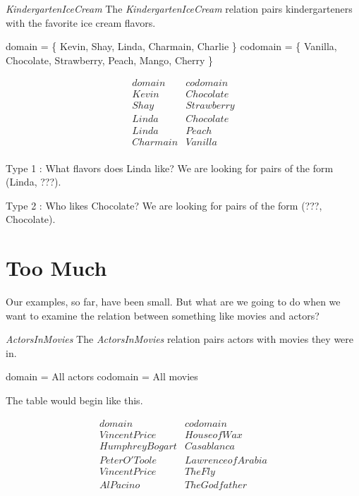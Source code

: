 \documentclass{ximera}
\begin{document}
\begin{example} \textit{KindergartenIceCream}
The \textit{KindergartenIceCream} relation pairs kindergarteners with the favorite ice cream flavors.

domain = \{ Kevin, Shay, Linda, Charmain, Charlie \}  
codomain = \{ Vanilla, Chocolate, Strawberry, Peach, Mango, Cherry \} 

\[
\begin{array}{l|l}
    domain      & codomain      \\ \hline
    Kevin   &  Chocolate \\
    Shay   & Strawberry \\
    Linda  &  Chocolate \\
    Linda  &  Peach \\
    Charmain &  Vanilla \\ 
\end{array}
\]


Type 1 : What flavors does Linda like?
We are looking for pairs of the form (Linda, ???).

Type 2 : Who likes Chocolate?
We are looking for pairs of the form (???, Chocolate).

\end{example} 



\section{Too Much}

Our examples, so far, have been small.  But what are we going to do when we want to examine the relation between something like movies and actors?  


\begin{example} \textit{ActorsInMovies}
The \textit{ActorsInMovies} relation pairs actors with movies they were in.

domain = All actors 
codomain = All movies

The table would begin like this.

\[
\begin{array}{l|l}
    domain      & codomain      \\ \hline
    Vincent Price   &  House of Wax \\
    Humphrey Bogart   & Casablanca \\
    Peter O'Toole  &  Lawrence of Arabia \\
    Vincent Price  &  The Fly \\
    Al Pacino &  The Godfather \\ 
\end{array}
\]

\end{example} 
\end{document}

